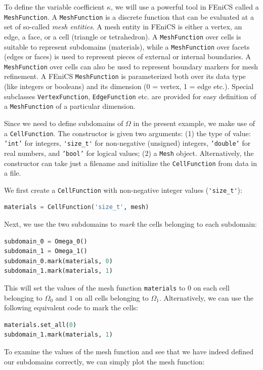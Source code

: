 \documentclass[graybox,envcountchap,sectrefs,final]{svmonodo}
\begin{document}
To define the variable coefficient $\kappa$, we will use a powerful tool in
FEniCS called a \texttt{MeshFunction}. A \texttt{MeshFunction} is a discrete
function that can be evaluated at a set of so-called \emph{mesh
entities}. A mesh entity in FEniCS is either a vertex, an edge, a
face, or a cell (triangle or tetrahedron). A \texttt{MeshFunction} over cells
is suitable to represent subdomains (materials), while a
\texttt{MeshFunction} over facets (edges or faces) is used to represent
pieces of external or internal boundaries. A \texttt{MeshFunction} over cells
can also be used to represent boundary markers for mesh refinement. A
FEniCS \texttt{MeshFunction} is parameterized both over its data type (like
integers or booleans) and its dimension (0 = vertex, 1 = edge
etc.). Special subclasses \texttt{VertexFunction}, \texttt{EdgeFunction} etc. are
provided for easy definition of a \texttt{MeshFunction} of a particular
dimension.

Since we need to define subdomains of $\Omega$ in the present example,
we make use of a \texttt{CellFunction}. The constructor
is given two arguments: (1) the type of value: \texttt{'int'} for integers,
\Verb!'size_t'! for non-negative (unsigned) integers, \texttt{'double'} for real
numbers, and \texttt{'bool'} for logical values; (2) a \texttt{Mesh} object.
Alternatively, the constructor can take just a filename and initialize
the \texttt{CellFunction} from data in a file.

We first create a \texttt{CellFunction} with non-negative
integer values (\Verb!'size_t'!):

\begin{lstlisting}[language=Python,style=graycolor]
materials = CellFunction('size_t', mesh)
\end{lstlisting}

Next, we use the two subdomains to \emph{mark} the cells belonging to each
subdomain:
\begin{lstlisting}[language=Python,style=graycolor]
subdomain_0 = Omega_0()
subdomain_1 = Omega_1()
subdomain_0.mark(materials, 0)
subdomain_1.mark(materials, 1)
\end{lstlisting}

This will set the values of the mesh function \texttt{materials} to $0$ on
each cell belonging to $\Omega_0$ and $1$ on all cells belonging to
$\Omega_1$. Alternatively, we can use the following equivalent code to
mark the cells:

\begin{lstlisting}[language=Python,style=graycolor]
materials.set_all(0)
subdomain_1.mark(materials, 1)
\end{lstlisting}
To examine the values of the mesh function and see that we have indeed
defined our subdomains correctly, we can simply plot the mesh
function:
\end{document}
